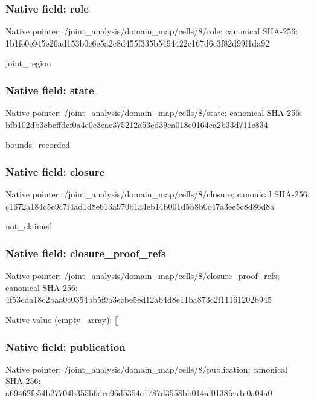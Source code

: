 \documentclass[10pt,a4paper]{article}
\begin{document}
\subsubsection{Native field: role}


Native pointer: /joint\_analysis/domain\_map/cells/8/role; canonical SHA-256: 1b1fe0e945e26ad153b0c6e5\allowbreak{}a2c8d455f335b5494422c167\allowbreak{}d6c3f82d99f1da92


joint\_region


\subsubsection{Native field: state}


Native pointer: /joint\_analysis/domain\_m\allowbreak{}ap/cells/8/state; canonical SHA-256: bfb102db3cbcffdcf0a4e0c3\allowbreak{}eac375212a53ed39ea018e01\allowbreak{}64ca2b33d711c834


bounds\_recorded


\subsubsection{Native field: closure}


Native pointer: /joint\_analysis/domain\_m\allowbreak{}ap/cells/8/closure; canonical SHA-256: c1672a184c5e9c7f4ad1d8e6\allowbreak{}13a970b1a4eb14b001d5b8b0\allowbreak{}c47a3ee5c8d86d8a


not\_claimed


\subsubsection{Native field: closure\_proof\_refs}


Native pointer: /joint\_analysis/domain\_m\allowbreak{}ap/cells/8/closure\_proof\allowbreak{}\_refs; canonical SHA-256: 4f53cda18c2baa0c0354bb5f\allowbreak{}9a3ecbe5ed12ab4d8e11ba87\allowbreak{}3c2f11161202b945



Native value (empty\_array): []



\subsubsection{Native field: publication}


Native pointer: /joint\_analysis/domain\_m\allowbreak{}ap/cells/8/publication; canonical SHA-256: a69462fe54b27704b355b6de\allowbreak{}c96d5354e1787d3558bb014a\allowbreak{}f0138fca1c0a04a0
\end{document}
